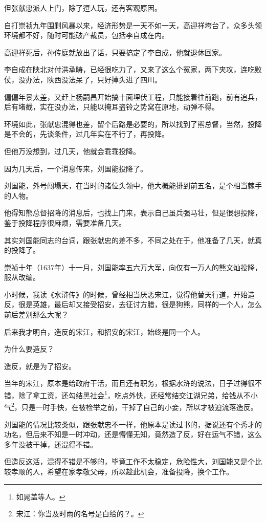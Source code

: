 \begin{multicols}{\theparacolNo}
但张献忠派人上门，除了逗人玩，还有客观原因。

自打崇祯九年围剿风暴以来，经济形势是一天不如一天，高迎祥垮台了，众多头领环境都不好，随时可能破产裁员，包括李自成在内。

高迎祥死后，孙传庭就放出了话，只要搞定了李自成，他就退休回家。

李自成在陕北对付洪承畴，已经很吃力了，又来了这么个冤家，两下夹攻，连吃败仗，没办法，陕西没法呆了，只好掉头进了四川。

偏偏年景太差，又赶上杨嗣昌开始搞十面埋伏工程，只能接着往前跑，前有追兵，后有堵截，实在没办法，只能以掩耳盗铃之势窝在原地，动弹不得。

环境如此，张献忠混得也差，留个后路是必要的，所以找到了熊总督，当然，投降是不会的，先谈条件，过几年实在不行了，再投降。

但他万没想到，过几天，他就会乖乖投降。

因为几天后，一个消息传来，刘国能投降了。

刘国能，外号闯塌天，在当时的诸位头领中，他大概能排到前五名，是个相当棘手的人物。

他得知熊总督招降的消息后，也找上门来，表示自己虽兵强马壮，但是很想投降，鉴于投降程序很麻烦，需要准备几天。

其实刘国能同志的台词，跟张献忠的差不多，不同之处在于，他准备了几天，就真的投降了。

崇祯十年（1637年）十一月，刘国能率五六万大军，向仅有一万人的熊文灿投降，服从改编。

小时候，我读《水浒传》的时候，曾经相当厌恶宋江，觉得他替天行道，开始造反，很是英雄，最后却又接受招安，去征讨方腊，很是狗熊，同样的一个人，怎么前后差别那么大呢？

后来我才明白，造反的宋江，和招安的宋江，始终是同一个人。

为什么要造反？

造反，就是为了招安。

当年的宋江，原本是给政府干活，而且还有职务，根据水浒的说法，日子过得很不错，除了拿工资，还勾结黑社会\footnote{如晁盖等人。}，吃点外快，还经常结交江湖兄弟，给钱从不小气\footnote{宋江：你当及时雨的名号是白给的？。}，只是一时手快，在被检举之前，干掉了自己的小妾，所以才被迫流落造反。

刘国能的情况比较类似，跟张献忠不一样，他原本是读过书的，据说还有个秀才的功名，但后来不知是一时冲动，还是懵懂无知，竟然造了反，好在运气不错，这么多年没被干掉，还混得不错。

但造反这活，混得不错是不够的，毕竟工作不太稳定，危险性大，刘国能又是个比较孝顺的人，希望在家孝敬父母，所以趁此机会，准备投降，换个工作。


\end{multicols}
